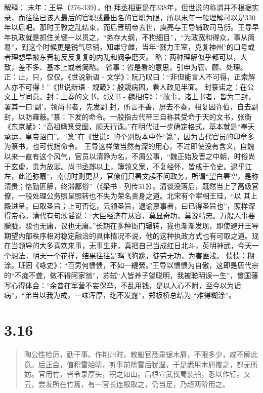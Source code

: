 \documentclass[]{book}
\begin{document}
解释： 末年：王导（276-339），他
拜丞相更是在338年，但世说的称谓并不根据实录，而往往已该人最后的官职或最出名的官职为限，所以末年一般理解可以是330年以后吧。那时王敦之乱结束，而后晋明帝去世，庾亮与王导辅政司马衍。王导早年执政就是抓住关键一以贯之，``务存大纲，不拘细目''，``为政宽和得众，事从简易''，到这个时候更是锐气尽销，知雄守雌，当年``戮力王室，克复神州''的口号或者理想早被东晋初反反复复的内乱和阀争磨灭。
略：两种理解似乎都可以，大致，差不多、基本上或者简略。
省事：省是看的意思，引申为管、顾、处理。 正：止，只，仅仅。《世说新语 -
文学》：阮乃叹曰：``非但能言人不可得，正索解人亦不可得！''《世说新语 -
规箴》：殷覬病困，看人政见半面。
封箓诺之：在公文上写同意。封：上奏的文书，《汉书 -
魏相传》：``故事，诸上书者，皆为二封，署其一曰`副'，领尚书者，先发副
封，所言不善，屏去不奏，相复因许伯，自去副封，以防雍蔽。''箓：下发的命令。一般指古代帝王自称其受命于天的文书，张衡《东京赋》：``高祖膺箓受图，顺天行诛。''在明代进一步确定格式，基本就是``奉天承运，皇帝诏曰''。``箓''在《世说》的个别版本中作``篆''，因为古代官员的印章多为篆书，也可代指命令。
王导这样做当然有深的用心，不过即使没有含义，自魏以来一直有这个风气，官员以清静为名，不屑公事，``魏正始及晋之中朝，时俗尚于玄虚，贵为放诞。尚书丞郎以上，簿领文案，不复经怀，皆成于令史。逮乎江左，此道弥扇''，南朝时则更甚，官僚们只署文牍不问政务，所谓``望白署空，是称清贵；恪勤匪解，终滞鄙俗''（《梁书
-
列传31》）。清谈没落后，既然当上了高级官僚，一般处理公务照呈照转也不失为荣名贵身之道。北宋有个宰相王珪，``以
其上殿进呈，曰取圣旨；上可否讫，云领圣旨，退谕禀事者，曰已得圣旨也''，照样深得帝心。清代有句歌谣说：``大臣经济在从容，莫显奇功，莫说精忠。万般人事要朦胧，驳也无庸，议也无庸。''长期在多种衙门辗转，我也渐渐发现，即使避开王导期望内部秩序相对稳定融洽的具体情况不说，他的这种执政方式也有可取之道。现在当领导的大多喜欢来事，无事生非，真把自己当成红日北斗，英明神武，今天一个想法，明天一个花样，结果往往是鸡飞狗跳，徒劳无功，为害匪浅。
愦愦：糊涂。班固《咏史》：``百男何愦愦，不如一緹縈。''王导以愦愦为自傲，这即是唐代宗的``不痴不聋，做不得阿家翁''，苏轼``人皆养子望聪明，我被聪明误一生''，曾国藩写心得体会：``余昔在军营不妄保举，不乱用钱，是以人心不附，至今以为诟病''，``弟当以我为戒，一味浑厚，绝不发露''，郑板桥总结为
``难得糊涂''。

\section{3.16}\label{section-170}

\begin{quote}
陶公性检厉，勤干事。作荆州时，敕船官悉录锯木屑，不限多少，咸不解此意。后正会，值积雪始晴，听事前除雪后犹湿，于是悉用木屑覆之，都无所妨。官用竹，皆令录厚头，积之如山。后桓宣武伐蜀装船，悉以作钉。又云，尝发所在竹篙，有一官长连根取之，仍当足，乃超两阶用之。
\end{quote}
\end{document}

